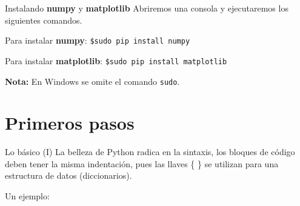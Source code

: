\documentclass[usenames,dvipsnames]{beamer}
\begin{document}
  \begin{frame}{Instalando \textbf{numpy} y \textbf{matplotlib}}
    Abriremos una consola y ejecutaremos los siguientes comandos.
    \begin{block}{Para instalar \textbf{numpy}:}
      \texttt{\$\hspace{0.3cm}sudo pip install numpy}
    \end{block}
    \vspace*{0.5cm}
    \begin{block}{Para instalar \textbf{matplotlib}:}
      \texttt{\$\hspace{0.3cm}sudo pip install matplotlib}
    \end{block}
    \textbf{Nota:} En Windows se omite el comando \texttt{sudo}.
  \end{frame}

  \section{Primeros pasos}
  \begin{frame}{Lo básico (I)}
    La belleza de Python radica en la sintaxis, los bloques de código deben
    tener la misma indentación, pues las llaves \{ \} se utilizan para una
    estructura de datos (diccionarios).\\

    \vspace*{0.5cm}
    \begin{block}{Un ejemplo:}
        \\
        \\
        \\
        \vspace*{0.5cm}
        \\
        \vspace*{0.5cm}
    \end{block}
  \end{frame}
\end{document}
